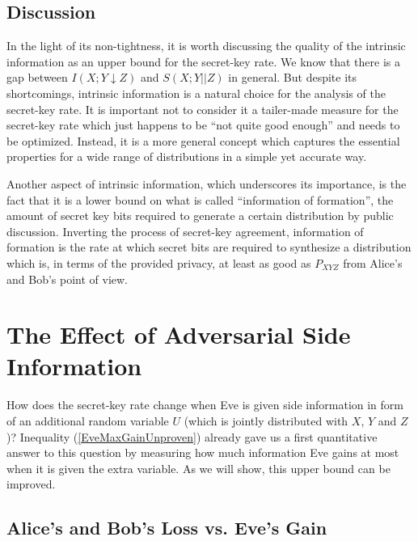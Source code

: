 \documentclass[a4paper, twoside, openany]{report}
\newcommand{\intrivar}[3]{I(#1;#2\!\!\downarrow\!#3)}
\newcommand{\intri}{\intrivar{X}{Y}{Z}}
\newcommand{\srate}{S(X;Y||Z)}
\theoremstyle{plain}
\theoremstyle{definition}
\begin{document}
\newpage

\section{Discussion}

In the light of its non-tightness, it is worth discussing the quality of the intrinsic information as an upper bound for the secret-key rate. We know that there is a gap between $\intri$ and $\srate$ in general. But despite its shortcomings, intrinsic information is a natural choice for the analysis of the secret-key rate. It is important not to consider it a tailer-made measure for the secret-key rate which just happens to be ``not quite good enough'' and needs to be optimized. Instead, it is a more general concept which captures the essential properties for a wide range of distributions in a simple yet accurate way.

Another aspect of intrinsic information, which underscores its importance, is the fact that it is a lower bound on what is called ``information of formation'', the amount of secret key bits required to generate a certain distribution by public discussion. Inverting the process of secret-key agreement, information of formation is the rate at which secret bits are required to synthesize a distribution which is, in terms of the provided privacy, at least as good as $P_{XYZ}$ from Alice's and Bob's point of view.


\chapter{The Effect of Adversarial Side Information} \label{ch:SideInformation}

How does the secret-key rate change when Eve is given side information in form of an additional random variable $U$ (which is jointly distributed with $X$, $Y$ and $Z$)? Inequality (\ref{EveMaxGainUnproven}) already gave us a first quantitative answer to this question by measuring how much information Eve gains at most when it is given the extra variable. As we will show, this upper bound can be improved.


\section{Alice's and Bob's Loss vs. Eve's Gain} \label{ABlossVsEGain}
\end{document}

